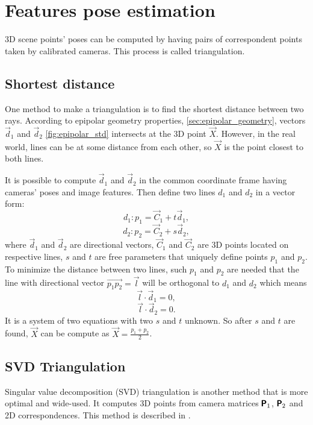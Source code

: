 \section{Features pose estimation}

3D scene points' poses can be computed by having pairs of correspondent points taken by calibrated cameras.
This process is called triangulation.

\subsection{Shortest distance}
One method to make a triangulation is to find the shortest distance between two rays.
According to epipolar geometry properties, \autoref{sec:epipolar_geometry}, vectors $\vec{d}_1$ and $\vec{d}_2$ \autoref{fig:epipolar_std} intersects at the 3D point $\vec{X}$.
However, in the real world, lines can be at some distance from each other, so $\vec{X}$ is the point closest to both lines.

It is possible to compute $\vec{d}_1$ and $\vec{d}_2$ in the common coordinate frame having cameras' poses and image features.
Then define two lines $d_1$ and $d_2$ in a vector form:
\begin{equation}
    d_1: p_1 = \vec{C}_1 + t \vec{d}_1,
\end{equation}
\begin{equation}
    d_2: p_2 = \vec{C}_2 + s \vec{d}_2,
\end{equation}
where $\vec{d}_1$ and $\vec{d}_2$ are directional vectors, $\vec{C}_1$ and $\vec{C}_2$ are 3D points located on respective lines, $s$ and $t$ are free parameters that uniquely define points $p_1$ and $p_2$. 
To minimize the distance between two lines, such $p_1$ and $p_2$ are needed that the line with directional vector $\vec{p_1p_2} = \vec{l}$ will be orthogonal to $d_1$ and $d_2$ which means
\begin{equation}
    \label{eq:ldd1}
    \vec{l} \cdot \vec{d}_1 = 0,
\end{equation}
\begin{equation}
    \label{eq:ldd2}
    \vec{l} \cdot \vec{d}_2 = 0.
\end{equation}
It is a system of two equations with two $s$ and $t$ unknown.
So after $s$ and $t$ are found, $\vec{X}$ can be compute as $\vec{X} = \frac{p_1 + p_2}{2}$.

\subsection{SVD Triangulation}
\label{sec:svdtriang}
Singular value decomposition (SVD) triangulation is another method that is more optimal and wide-used.
It computes 3D points from camera matrices $\pmb{\mathsf{P}}_1$, $\pmb{\mathsf{P}}_2$ and 2D correspondences. 
This method is described in \cite{hartley_zisserman_2004}.

